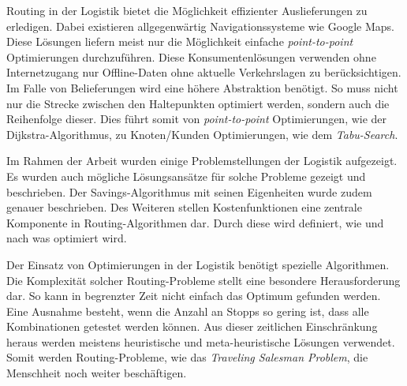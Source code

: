 Routing in der Logistik bietet die Möglichkeit effizienter Auslieferungen zu erledigen. 
Dabei existieren allgegenwärtig Navigationssysteme wie Google Maps. 
Diese Lösungen liefern meist nur die Möglichkeit einfache \textit{point-to-point} Optimierungen durchzuführen. 
Diese Konsumentenlösungen verwenden ohne Internetzugang nur Offline-Daten ohne aktuelle Verkehrslagen zu berücksichtigen. 
Im Falle von Belieferungen wird eine höhere Abstraktion benötigt.
So muss nicht nur die Strecke zwischen den Haltepunkten optimiert werden, sondern auch die Reihenfolge dieser. 
Dies führt somit von \textit{point-to-point} Optimierungen, wie der Dijkstra-Algorithmus, zu Knoten/Kunden Optimierungen, wie dem \textit{Tabu-Search}. 

\noindent
Im Rahmen der Arbeit wurden einige Problemstellungen der Logistik aufgezeigt. 
Es wurden auch mögliche Lösungsansätze für solche Probleme gezeigt und beschrieben. 
Der Savings-Algorithmus mit seinen Eigenheiten wurde zudem genauer beschrieben. 
Des Weiteren stellen Kostenfunktionen eine zentrale Komponente in Routing-Algorithmen dar. 
Durch diese wird definiert, wie und nach was optimiert wird. 

\noindent
Der Einsatz von Optimierungen in der Logistik benötigt spezielle Algorithmen. 
Die Komplexität solcher Routing-Probleme stellt eine besondere Herausforderung dar. 
So kann in begrenzter Zeit nicht einfach das Optimum gefunden werden.
Eine Ausnahme besteht, wenn die Anzahl an Stopps so gering ist, dass alle Kombinationen getestet werden können. 
Aus dieser zeitlichen Einschränkung heraus werden meistens heuristische und meta-heuristische Lösungen verwendet. 
Somit werden Routing-Probleme, wie das \textit{Traveling Salesman Problem}, die Menschheit noch weiter beschäftigen. 